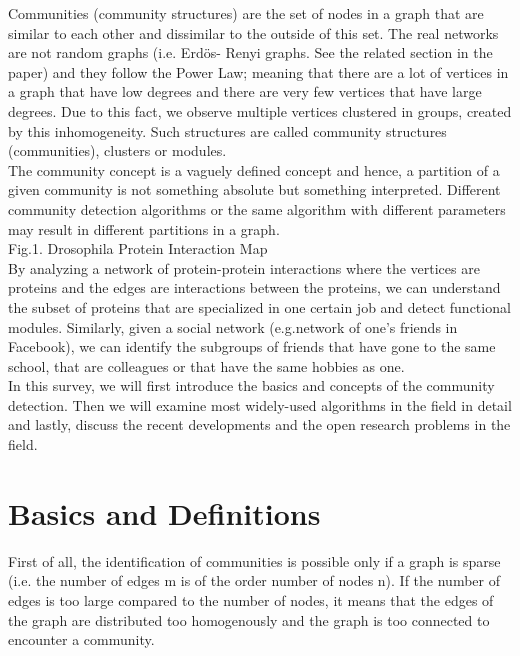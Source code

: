 \documentclass[10pt]{article}
\begin{document}
Communities (community structures) are the set of nodes in a graph that are similar to each other and dissimilar to the outside of this set. The real networks are not random graphs (i.e. Erdös- Renyi graphs. See the related section in the paper) and they follow the Power Law\cite{fortunato}; meaning that there are a lot of vertices in a graph that have low degrees and there are very few vertices that have large degrees. Due to this fact, we observe multiple vertices clustered in groups, created by this inhomogeneity. Such structures are called community structures (communities), clusters or modules. \\

The community concept is a vaguely defined concept and hence, a partition of a given community is not something absolute but something interpreted. Different community detection algorithms or the same algorithm with different parameters may result in different partitions in a graph.\\

Fig.1. Drosophila Protein Interaction Map \cite{protein} \\

By analyzing a network of protein-protein interactions where the vertices are proteins and the edges are interactions between the proteins, we can understand the subset of proteins that are specialized in one certain job\cite{protein} and detect functional modules. Similarly, given a social network (e.g.network of one’s friends in Facebook), we can identify the subgroups of friends that have gone to the same school, that are colleagues or that have the same hobbies as one. \\

In this survey, we will first introduce the basics and concepts of the community detection. Then we will examine most widely-used algorithms in the field in detail and lastly, discuss the recent developments and the open research problems in the field. \\

\section{Basics and Definitions}

First of all, the identification of communities is possible only if a graph is sparse (i.e. the number of edges m is of the order number of nodes n). If the number of edges is too large compared to the number of nodes, it means that the edges of the graph are distributed too homogenously and the graph is too connected to encounter a community\cite{fortunato}. \\
\end{document}
